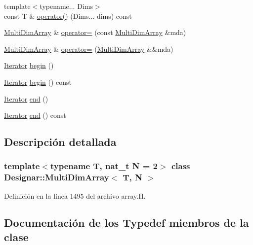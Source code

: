 \begin{DoxyCompactItemize}
\item 
{\footnotesize template$<$typename... Dims$>$ }\\const T \& \hyperlink{class_designar_1_1_multi_dim_array_a1edce0b31104f2b50bd8f8047e373b78}{operator()} (Dims... dims) const
\item 
\hyperlink{class_designar_1_1_multi_dim_array}{Multi\+Dim\+Array} \& \hyperlink{class_designar_1_1_multi_dim_array_a4f191233c720bc670a181682b0452347}{operator=} (const \hyperlink{class_designar_1_1_multi_dim_array}{Multi\+Dim\+Array} \&mda)
\item 
\hyperlink{class_designar_1_1_multi_dim_array}{Multi\+Dim\+Array} \& \hyperlink{class_designar_1_1_multi_dim_array_a45e425f7a1795d97822d8fafe5c02244}{operator=} (\hyperlink{class_designar_1_1_multi_dim_array}{Multi\+Dim\+Array} \&\&mda)
\item 
\hyperlink{class_designar_1_1_multi_dim_array_1_1_iterator}{Iterator} \hyperlink{class_designar_1_1_multi_dim_array_adaed0d8dcdb5500e751f27418e914c4d}{begin} ()
\item 
\hyperlink{class_designar_1_1_multi_dim_array_1_1_iterator}{Iterator} \hyperlink{class_designar_1_1_multi_dim_array_ad3760c3ce200ee63585ab7c7841b433d}{begin} () const
\item 
\hyperlink{class_designar_1_1_multi_dim_array_1_1_iterator}{Iterator} \hyperlink{class_designar_1_1_multi_dim_array_a6fc4ca23162a6b285f2a6fd698232459}{end} ()
\item 
\hyperlink{class_designar_1_1_multi_dim_array_1_1_iterator}{Iterator} \hyperlink{class_designar_1_1_multi_dim_array_a83200332e5914f2485d64cedb87b9470}{end} () const
\end{DoxyCompactItemize}


\subsection{Descripción detallada}
\subsubsection*{template$<$typename T, nat\+\_\+t N = 2$>$\newline
class Designar\+::\+Multi\+Dim\+Array$<$ T, N $>$}



Definición en la línea 1495 del archivo array.\+H.



\subsection{Documentación de los \textquotesingle{}Typedef\textquotesingle{} miembros de la clase}
\mbox{\label{class_designar_1_1_multi_dim_array_a23b3bec3a6a803d8ef7becceb592d6c0}} 
